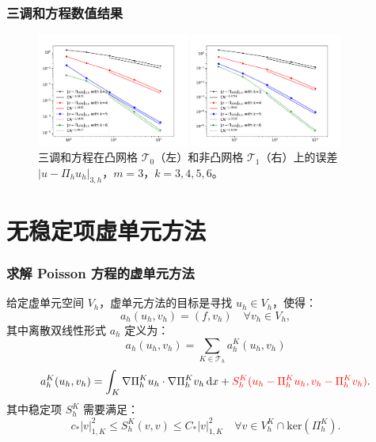 \documentclass[notheorems,serif]{beamer}
\begin{document}
\begin{frame}
    \frametitle{三调和方程数值结果}
\begin{figure}[htbp]
\centering
\begin{minipage}[t]{0.49\linewidth}
\centering
\includegraphics[width=5cm]{../figures/H3_convex.pdf}
\end{minipage}%
\begin{minipage}[t]{0.49\linewidth}
\centering
\includegraphics[width=5cm]{../figures/H3_nonconvex.pdf}
\end{minipage}
\caption{三调和方程在凸网格 $\mathcal{T}_0$（左）和非凸网格 $\mathcal{T}_1$（右）上的误差 $|u - \Pi_h u_h|_{3, h}$，$m=3$，$k=3, 4, 5, 6$。}
\label{fig:H3error}
\end{figure}
\end{frame}


\section{无稳定项虚单元方法}
\begin{frame}
\frametitle{求解 Poisson 方程的虚单元方法}
给定虚单元空间 $V_h$，虚单元方法的目标是寻找 $u_h \in V_h$，使得：
$$
a_h(u_h, v_h) = (f, v_h) \quad \forall v_h \in V_h,
$$
其中离散双线性形式 $a_h$ 定义为：
$$
a_h(u_h, v_h) = \sum_{K \in \mathcal{T}_h} a_h^K(u_h, v_h)
$$
$$
a_h^K(u_h, v_h) = \int_K \nabla \Pi_h^K u_h \cdot \nabla \Pi_h^K v_h \, \mathrm{d}x + \highlightit{S_h^K(u_h - \Pi_h^K u_h, v_h - \Pi_h^K v_h)}.
$$
其中稳定项 $S_h^K$ 需要满足：
$$
c_* |v|_{1, K}^2 \leq S_h^K(v, v) \leq C_* |v|_{1, K}^2 \quad \forall v \in 
V_h^K \cap \mathrm{ker}(\Pi_h^K).
$$
\end{frame}
\end{document}

